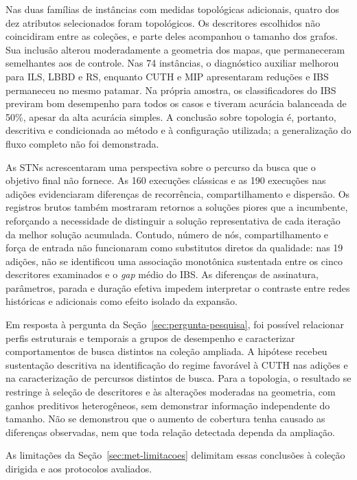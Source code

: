 Nas duas famílias de instâncias com medidas topológicas adicionais,
quatro dos dez atributos selecionados foram topológicos. Os descritores
escolhidos não coincidiram entre as coleções, e parte deles acompanhou o
tamanho dos grafos. Sua inclusão alterou moderadamente a geometria dos
mapas, que permaneceram semelhantes aos de controle. Nas 74 instâncias,
o diagnóstico auxiliar melhorou
para ILS, LBBD e RS, enquanto CUTH e MIP apresentaram reduções e IBS
permaneceu no mesmo patamar. Na própria amostra, os classificadores do IBS
previram bom desempenho para todos os casos e tiveram acurácia balanceada
de 50\%, apesar da alta acurácia simples. A conclusão sobre topologia é,
portanto, descritiva e condicionada ao método e à configuração utilizada;
a generalização do fluxo completo não foi demonstrada.

As STNs acrescentaram uma perspectiva sobre o percurso da busca que o
objetivo final não fornece. As 160 execuções clássicas e as 190 execuções
nas adições evidenciaram diferenças de recorrência, compartilhamento e
dispersão. Os registros brutos também mostraram retornos a soluções piores
que a incumbente, reforçando a necessidade de distinguir a solução
representativa de cada iteração da melhor solução acumulada. Contudo,
número de nós, compartilhamento e força de entrada não funcionaram como
substitutos diretos da qualidade: nas 19 adições, não se identificou uma
associação monotônica sustentada entre os cinco descritores examinados
e o \textit{gap} médio do IBS. As diferenças de assinatura, parâmetros,
parada e duração efetiva impedem interpretar o contraste entre redes
históricas e adicionais como efeito isolado da expansão.

Em resposta à pergunta da Seção~\ref{sec:pergunta-pesquisa}, foi possível
relacionar perfis estruturais e temporais a grupos de desempenho e
caracterizar comportamentos de busca distintos na coleção ampliada.
A hipótese recebeu sustentação descritiva na identificação do regime
favorável à CUTH nas adições e na caracterização de percursos distintos
de busca. Para a topologia, o resultado se restringe à seleção de
descritores e às alterações moderadas na geometria, com ganhos preditivos
heterogêneos, sem demonstrar informação independente do tamanho.
Não se demonstrou que o aumento de cobertura tenha causado as diferenças
observadas, nem que toda relação detectada dependa da ampliação.

As limitações da Seção~\ref{sec:met-limitacoes} delimitam essas conclusões
à coleção dirigida e aos protocolos avaliados.

